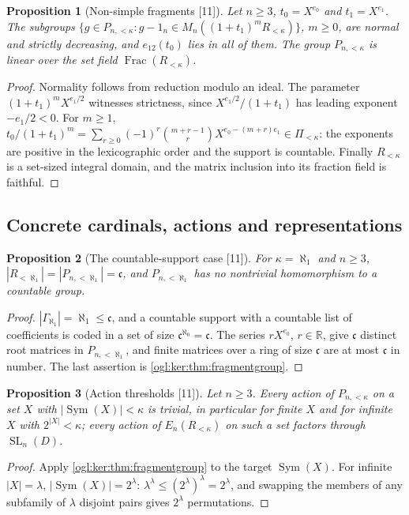 \documentclass[11pt,oneside]{article}
\numberwithin{equation}{section}
\newtheorem{proposition}[proposition]{Proposition}
\theoremstyle{definition}
\theoremstyle{remark}
\newcommand{\R}{\mathbb R}
\newcommand{\SL}{\operatorname{SL}}
\newcommand{\Sym}{\operatorname{Sym}}
\newcommand{\Frac}{\operatorname{Frac}}
\newcommand{\src}[1]{\textup{\textsf{\small[#1]}}}
\begin{document}
\begin{proposition}[Non-simple fragments \src{11}]\label{ogl:ker:prop:fragmentfiltration}
Let $n\ge3$, $t_0=X^{e_0}$ and $t_1=X^{e_1}$. The subgroups
$\{g\in P_{n,<\kappa}:g-1_n\in M_n((1+t_1)^mR_{<\kappa})\}$, $m\ge0$, are normal
and strictly decreasing, and $e_{12}(t_0)$ lies in all of them. The group
$P_{n,<\kappa}$ is linear over the set field $\Frac(R_{<\kappa})$.
\end{proposition}
\begin{proof}
Normality follows from reduction modulo an ideal. The parameter
$(1+t_1)^mX^{e_1/2}$ witnesses strictness, since $X^{e_1/2}/(1+t_1)$ has leading
exponent $-e_1/2<0$. For $m\ge1$,
$t_0/(1+t_1)^m=\sum_{r\ge0}(-1)^r\binom{m+r-1}{r}X^{e_0-(m+r)e_1}\in\Pi_{<\kappa}$:
the exponents are positive in the lexicographic order and the support is
countable. Finally $R_{<\kappa}$ is a set-sized integral domain, and the matrix
inclusion into its fraction field is faithful.
\end{proof}

\subsection{Concrete cardinals, actions and representations}

\begin{proposition}[The countable-support case \src{11}]\label{ogl:ker:prop:continuum}
For $\kappa=\aleph_1$ and $n\ge3$, $|R_{<\aleph_1}|=|P_{n,<\aleph_1}|=\mathfrak c$, and
$P_{n,<\aleph_1}$ has no nontrivial homomorphism to a countable group.
\end{proposition}
\begin{proof}
$|\Gamma_{\aleph_1}|=\aleph_1\le\mathfrak c$, and a countable support with a
countable list of coefficients is coded in a set of size
$\mathfrak c^{\aleph_0}=\mathfrak c$. The series $rX^{e_0}$, $r\in\R$, give
$\mathfrak c$ distinct root matrices in $P_{n,<\aleph_1}$, and finite matrices
over a ring of size $\mathfrak c$ are at most $\mathfrak c$ in number. The last
assertion is \cref{ogl:ker:thm:fragmentgroup}.
\end{proof}

\begin{proposition}[Action thresholds \src{11}]\label{ogl:ker:prop:actioncard}
Let $n\ge3$. Every action of $P_{n,<\kappa}$ on a set $X$ with $|\Sym(X)|<\kappa$
is trivial, in particular for finite $X$ and for infinite $X$ with
$2^{|X|}<\kappa$; every action of $E_n(R_{<\kappa})$ on such a set factors
through $\SL_n(D)$.
\end{proposition}
\begin{proof}
Apply \cref{ogl:ker:thm:fragmentgroup} to the target $\Sym(X)$. For infinite
$|X|=\lambda$, $|\Sym(X)|=2^\lambda$: $\lambda^\lambda\le(2^\lambda)^\lambda=2^\lambda$,
and swapping the members of any subfamily of $\lambda$ disjoint pairs gives
$2^\lambda$ permutations.
\end{proof}
\end{document}
